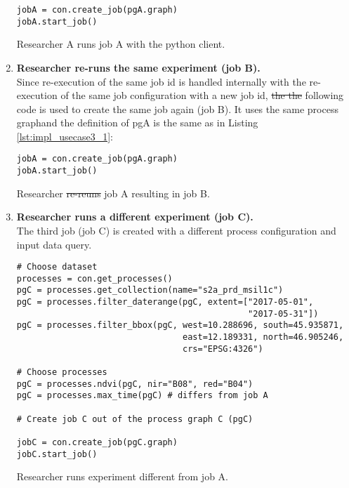 \documentclass[draft,final]{vutinfth} %
\newenvironment{code}{\captionsetup{type=listing}}{}
\providecommand{\DIFaddtex}[1]{{\protect\color{blue}\uwave{#1}}} %
\providecommand{\DIFdeltex}[1]{{\protect\color{red}\sout{#1}}}                      %
\providecommand{\DIFaddbegin}{} %
\providecommand{\DIFaddend}{} %
\providecommand{\DIFdelbegin}{} %
\providecommand{\DIFdelend}{} %
\providecommand{\DIFadd}[1]{\texorpdfstring{\DIFaddtex{#1}}{#1}} %
\providecommand{\DIFdel}[1]{\texorpdfstring{\DIFdeltex{#1}}{}} %
\begin{document}
\begin{enumerate}
\begin{code}
\begin{verbatim}
jobA = con.create_job(pgA.graph)
jobA.start_job()
	\end{verbatim}
	\caption{Researcher A runs job A with the python client.}
	\label{lst:impl_usecase3_1}
\end{code}
	\item \textbf{Researcher re-runs the same experiment (job B).}\\
	Since re-execution of the same job id is handled internally with the re-execution of the same job configuration with a new job id, \DIFdelbegin \DIFdel{the the }\DIFdelend \DIFaddbegin \DIFadd{then the }\DIFaddend following code is used to create the same job again (job B). It uses the same process graph\DIFaddbegin \DIFadd{, }\DIFaddend and the definition of pgA is the same as in Listing \ref{lst:impl_usecase3_1}:
\begin{code}
	\begin{verbatim}
jobA = con.create_job(pgA.graph)
jobA.start_job()
	\end{verbatim}
	\caption{Researcher \DIFdelbegin \DIFdel{re-reuns }\DIFdelend \DIFaddbegin \DIFadd{re-reruns }\DIFaddend job A resulting in job B.}
	\label{lst:impl_usecase3_2}
\end{code}

	\item \textbf{Researcher runs a different experiment (job C).}\\
	The third job (job C) is created with a different process configuration and input data query.

\begin{code}
	\begin{verbatim}
# Choose dataset
processes = con.get_processes()
pgC = processes.get_collection(name="s2a_prd_msil1c")
pgC = processes.filter_daterange(pgC, extent=["2017-05-01", 
                                              "2017-05-31"])
pgC = processes.filter_bbox(pgC, west=10.288696, south=45.935871, 
                                 east=12.189331, north=46.905246, 
                                 crs="EPSG:4326")

# Choose processes
pgC = processes.ndvi(pgC, nir="B08", red="B04")
pgC = processes.max_time(pgC) # differs from job A

# Create job C out of the process graph C (pgC)

jobC = con.create_job(pgC.graph)
jobC.start_job()
	\end{verbatim}
	\caption{Researcher runs experiment different from job A.}
	\label{lst:impl_usecase3_3}


\end{code}
\end{enumerate}
\end{document}
